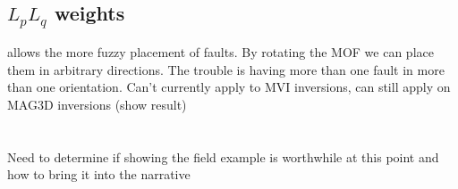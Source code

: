 \subsection{$L_p L_q$ weights}
\label{sec:Lp Lq weights:ElPoma}

allows the more fuzzy placement of faults. By rotating the \ac{MOF} we can place them in arbitrary directions. The trouble is having more than one fault in more than one orientation. Can't currently apply to MVI inversions, can still apply on MAG3D inversions 
(show result)
\\\\\\
Need to determine if showing the field example is worthwhile at this point and how to bring it into the narrative

\endinput




Any text after an \endinput is ignored.
You could put scraps here or things in progress.
